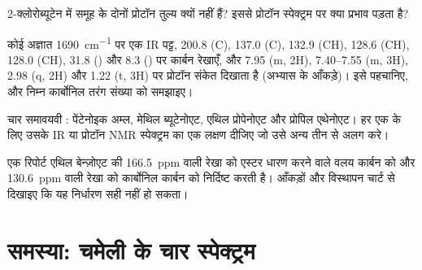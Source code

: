 \begin{exercise}[$\star\star$]\label{exo:b2:structure-determination:9}
2-क्लोरोब्यूटेन में  समूह के दोनों प्रोटॉन तुल्य क्यों नहीं हैं? इससे
प्रोटॉन स्पेक्ट्रम पर क्या प्रभाव पड़ता है?
\end{exercise}

\begin{exercise}[$\star\star\star$]\label{exo:b2:structure-determination:10}
कोई अज्ञात  \qty{1690}{cm^{-1}} पर एक IR पट्ट, 200.8 (C), 137.0 (C),
132.9 (CH), 128.6 (CH), 128.0 (CH), 31.8 () और 8.3 () पर कार्बन रेखाएँ, और 7.95 (m,
2H), 7.40--7.55 (m, 3H), 2.98 (q, 2H) और 1.22 (t, 3H) पर प्रोटॉन संकेत दिखाता है (अभ्यास के आँकड़े)। इसे पहचानिए, और
निम्न कार्बोनिल तरंग संख्या को समझाइए।
\end{exercise}

\begin{exercise}[$\star\star\star$]\label{exo:b2:structure-determination:11}
चार समावयवी : पेंटेनोइक अम्ल, मेथिल ब्यूटेनोएट, एथिल प्रोपेनोएट और प्रोपिल एथेनोएट।
हर एक के लिए उसके IR या प्रोटॉन NMR स्पेक्ट्रम का एक लक्षण दीजिए जो उसे अन्य तीन से अलग करे।
\end{exercise}

\begin{exercise}[$\star\star\star$]\label{exo:b2:structure-determination:12}
एक रिपोर्ट एथिल बेन्ज़ोएट की 166.5~ppm वाली रेखा को एस्टर धारण करने वाले वलय कार्बन को और
130.6~ppm वाली रेखा को कार्बोनिल कार्बन को निर्दिष्ट करती है।  आँकड़ों और विस्थापन चार्ट से दिखाइए कि
यह निर्धारण सही नहीं हो सकता।
\end{exercise}

\section{समस्या: चमेली के चार स्पेक्ट्रम}

